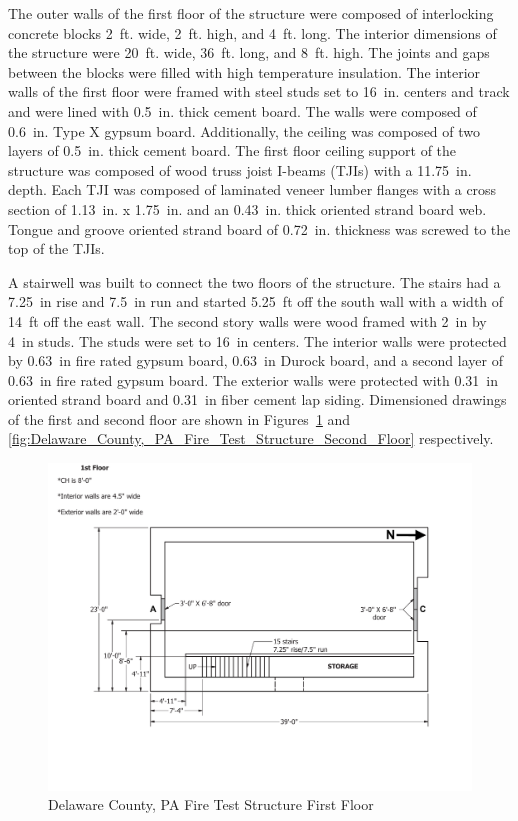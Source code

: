 \documentclass[12pt,oneside]{book}
\begin{document}
The outer walls of the first floor of the structure were composed of interlocking concrete blocks 2~ft. wide, 2~ft. high, and 4~ft. long. The interior dimensions of the structure were 20~ft. wide, 36~ft. long, and 8~ft. high. The joints and gaps between the blocks were filled with high temperature insulation. The interior walls of the first floor were framed with steel studs set to 16~in. centers and track and were lined with 0.5~in. thick cement board. The walls were composed of 0.6~in. Type X gypsum board. Additionally, the ceiling was composed of two layers of 0.5~in. thick cement board. The first floor ceiling support of the structure was composed of wood truss joist I-beams (TJIs) with a 11.75~in. depth. Each TJI was composed of laminated veneer lumber flanges with a cross section of 1.13~in. x 1.75~in. and an 0.43~in. thick oriented strand board web. Tongue and groove oriented strand board of 0.72~in. thickness was screwed to the top of the TJIs. 

A stairwell was built to connect the two floors of the structure. The stairs had a 7.25~in rise and 7.5~in run and started 5.25~ft off the south wall with a width of 14~ft off the east wall. The second story walls were wood framed with 2~in by 4~in studs. The studs were set to 16~in centers. The interior walls were protected by 0.63~in fire rated gypsum board, 0.63~in Durock board, and a second layer of 0.63~in fire rated gypsum board. The exterior walls were protected with 0.31~in oriented strand board and 0.31~in fiber cement lap siding. Dimensioned drawings of the first and second floor are shown in Figures~\ref{fig:Delaware_County,_PA_Fire_Test_Structure_First_Floor} and \ref{fig:Delaware_County,_PA_Fire_Test_Structure_Second_Floor} respectively.

\begin{figure}[!ht]
	\centering
	\includegraphics[width=\columnwidth]{Figures/Air_Entrainment/West_Test_Structure_1st_Floor_original_nodim.pdf}
	\caption{Delaware County, PA Fire Test Structure First Floor}
	\label{fig:Delaware_County,_PA_Fire_Test_Structure_First_Floor}
\end{figure}
\end{document}
